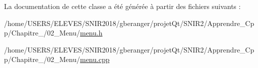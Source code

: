 La documentation de cette classe a été générée à partir des fichiers suivants \+:\begin{DoxyCompactItemize}
\item 
/home/\+U\+S\+E\+R\+S/\+E\+L\+E\+V\+E\+S/\+S\+N\+I\+R2018/gberanger/projet\+Qt/\+S\+N\+I\+R2/\+Apprendre\+\_\+\+Cpp/\+Chapitre\+\_/02\+\_\+\+Menu/\hyperlink{menu_8h}{menu.\+h}\item 
/home/\+U\+S\+E\+R\+S/\+E\+L\+E\+V\+E\+S/\+S\+N\+I\+R2018/gberanger/projet\+Qt/\+S\+N\+I\+R2/\+Apprendre\+\_\+\+Cpp/\+Chapitre\+\_/02\+\_\+\+Menu/\hyperlink{menu_8cpp}{menu.\+cpp}\end{DoxyCompactItemize}
